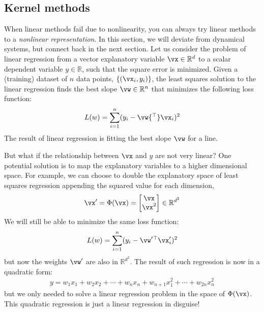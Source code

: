 \documentclass[a4paper,11pt]{exam}
\newcounter{ct}
\newcommand{\trp}{{^\top}} %
\newcommand{\field}[1]{\ensuremath{\mathbb{#1}}}
\newcommand{\reals}{\field{R}}
\begin{document}
\begin{questions}
\subsection{Kernel methods}
When linear methods fail due to nonlinearity, you can always try linear methods to a \emph{nonlinear representation}.
In this section, we will deviate from dynamical systems, but connect back in the next section.
Let us consider the problem of linear regression from a vector explanatory variable $\vx \in \reals^d$ to a scalar dependent variable $y \in \reals$, such that the square error is minimized.
Given a (training) dataset of $n$ data points, $\{ (\vx_i, y_i) \}$, the least squares solution to the linear regression finds the best slope $\vw \in \reals^n$ that minimizes the following loss function:
\begin{align}\label{eq:leastsquares:linear}
    L(w) = \sum_{i=1}^n (y_i - \vw\trp \vx_i)^2
\end{align}
The result of linear regression is fitting the best slope $\vw$ for a line.

But what if the relationship between $\vx$ and $y$ are not very linear?
One potential solution is to map the explanatory variables to a higher dimensional space.
For example, we can choose to double the explanatory space of least squares regression appending the squared value for each dimension,
\begin{align}
\vx' = \Phi(\vx) =
\begin{bmatrix}
\vx
\\
\vx^2
\end{bmatrix}
\in \reals^{d^2}
\end{align}
We will still be able to minimize the same loss function:
\begin{align}\label{eq:leastsquares:quadratic}
    L(w) = \sum_{i=1}^n (y_i - \vw'\trp \vx'_i)^2
\end{align}
but now the weights $\vw'$ are also in $\reals^{d^2}$.
The result of such regression is now in a quadratic form:
\begin{align}
	y = w_1 x_1 + w_2 x_2 + \cdots + w_n x_n + w_{n+1} x_1^2 + \cdots + w_{2n} x_n^2
\end{align}
but we only needed to solve a linear regression problem in the space of $\Phi(\vx)$.
This quadratic regression is just a linear regression in disguise!


\end{questions}
\end{document}
